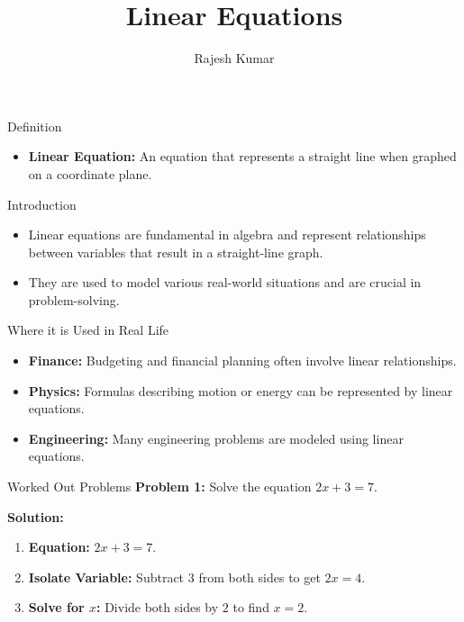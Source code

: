 \title{Linear Equations}
\author{Rajesh Kumar}
\date{}

\begin{frame}
  \titlepage
\end{frame}

\begin{frame}{Definition}
  \begin{itemize}
    \item \textbf{Linear Equation:} An equation that represents a straight line when graphed on a coordinate plane.
  \end{itemize}
\end{frame}

\begin{frame}{Introduction}
  \begin{itemize}
    \item Linear equations are fundamental in algebra and represent relationships between variables that result in a straight-line graph.
    \item They are used to model various real-world situations and are crucial in problem-solving.
  \end{itemize}
\end{frame}

\begin{frame}{Where it is Used in Real Life}
  \begin{itemize}
    \item \textbf{Finance:} Budgeting and financial planning often involve linear relationships.
    \item \textbf{Physics:} Formulas describing motion or energy can be represented by linear equations.
    \item \textbf{Engineering:} Many engineering problems are modeled using linear equations.
  \end{itemize}
\end{frame}

\begin{frame}{Worked Out Problems}
  \textbf{Problem 1:} Solve the equation $2x + 3 = 7$.

  \textbf{Solution:}
  \begin{enumerate}
    \item \textbf{Equation:} $2x + 3 = 7$.
    \item \textbf{Isolate Variable:} Subtract $3$ from both sides to get $2x = 4$.
    \item \textbf{Solve for $x$:} Divide both sides by $2$ to find $x = 2$.
  \end{enumerate}
\end{frame}

